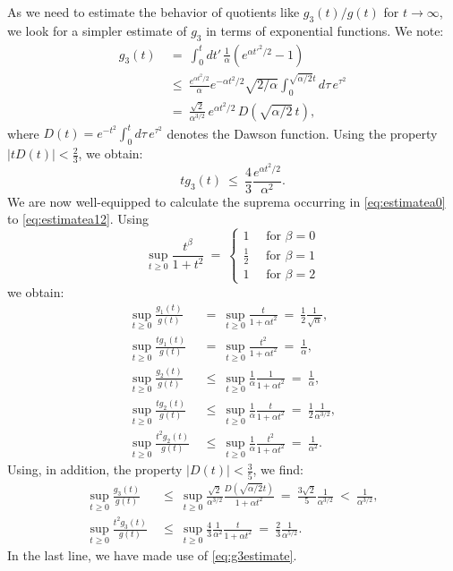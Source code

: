 \documentclass[b5paper,draft,openbib,12pt]{memoir}
\begin{document}
As we need to estimate the behavior of quotients like $g_3(t)/g(t)$ 
for $t\rightarrow \infty$, we look for a simpler estimate of $g_3$ 
in terms of exponential functions. We note:
\begin{align}
	g_3(t) ~&=~ \int_0^t dt'\,  \frac{1}{\alpha} \left( e^{\alpha {t'}^2/2} -1\right)\nonumber\\
	&\le~ \frac{e^{\alpha t^2/2}}{\alpha} e^{-\alpha t^2/2} \sqrt{2/\alpha} \int_0^{\sqrt{\alpha/2} t}  d\tau  \,e^{\tau^2}\nonumber\\
	&=~\frac{\sqrt{2}}{\alpha^{3/2}} \, e^{\alpha t^2/2} \, D(\sqrt{\alpha/2}\,t),
\end{align}
where $D(t) = e^{-t^2}\int_0^{t}  d\tau \, e^{\tau^2}$ denotes the 
Dawson function.
Using the property \(|tD(t)|<\frac{2}{3}\), we obtain:
\begin{equation}
	t g_3(t)~\leq~\frac{4}{3} \frac{e^{\alpha t^2/2}}{\alpha^{2}}.
\label{eq:g3estimate}
\end{equation}
We are now well-equipped to calculate the suprema occurring in 
\eqref{eq:estimatea0} to \eqref{eq:estimatea12}. Using
\begin{equation}
 \sup_{t\geq 0}\frac{t^\beta}{1+t^2} ~=~ \left\{ \begin{matrix} 1\quad \text{ for } \beta=0\\ \frac{1}{2} \quad \text{ for } \beta=1 \\ 1\quad \text{ for } \beta=2 \end{matrix}\right. 
\end{equation}
we obtain:
\begin{align}
	\sup_{t\geq 0} \frac{g_1(t)}{g(t)} ~&=~ \sup_{t\geq 0} \frac{t}{1+\alpha t^2} ~=~ \frac{1}{2}\frac{1}{\sqrt{\alpha}},\label{eq:sup1}\\
	\sup_{t\geq 0} \frac{t g_1(t)}{g(t)} ~&=~ \sup_{t\geq 0} \frac{t^2}{1+\alpha t^2} ~=~ \frac{1}{\alpha},\label{eq:sup2}\\
	\sup_{t\geq 0} \frac{g_2(t)}{g(t)} ~&\leq~ \sup_{t\geq 0} \frac{1}{\alpha} \frac{1}{1+\alpha t^2} ~=~ \frac{1}{\alpha},\label{eq:sup3}\\
\sup_{t\geq 0} \frac{tg_2(t)}{g(t)} ~&\leq~ \sup_{t\geq 0} \frac{1}{\alpha} \frac{t}{1+\alpha t^2} ~=~ \frac{1}{2}\frac{1}{\alpha^{3/2}},\label{eq:sup4}\\
\sup_{t\geq 0} \frac{t^2g_2(t)}{g(t)} ~&\leq~ \sup_{t\geq 0} \frac{1}{\alpha} \frac{t^2}{1+\alpha t^2} ~=~ \frac{1}{\alpha^2}\label{eq:sup5}.
\end{align}
Using, in addition, the property $|D(t)| < \frac{3}{5}$, we find:
\begin{align}
	\sup_{t\geq 0} \frac{g_3(t)}{g(t)} ~&\leq~ \sup_{t\geq 0} \frac{\sqrt{2}}{\alpha^{3/2}} \frac{D(\sqrt{\alpha/2}t)}{1+\alpha t^2} ~=~ \frac{3\sqrt{2}}{5}\frac{1}{\alpha^{3/2}} ~<~ \frac{1}{\alpha^{3/2}},\label{eq:sup6}\\
\sup_{t\geq 0} \frac{t^2 g_3(t)}{g(t)} ~&\leq~ \sup_{t\geq 0} \frac{4}{3}\frac{1}{\alpha^2} \frac{t}{1+\alpha t^2} ~=~\frac{2}{3}\frac{1}{\alpha^{5/2}}. \label{eq:sup7}
\end{align}
In the last line, we have made use of \eqref{eq:g3estimate}.
\end{document}
